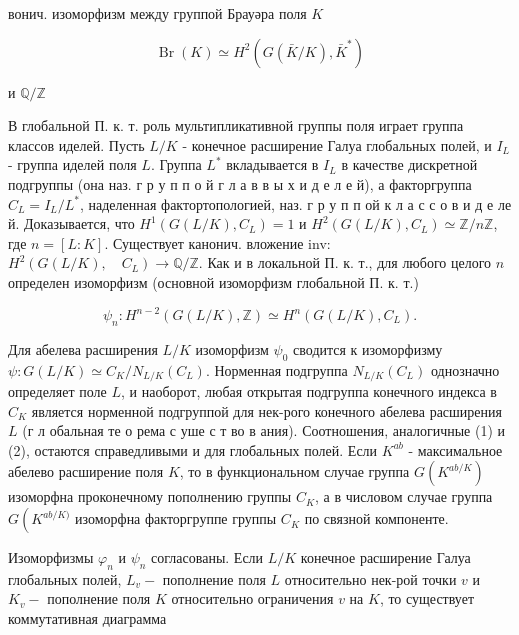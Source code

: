\documentclass[10pt]{article}
\begin{document}
вонич. изоморфизм между группой Брауәра поля $K$



\[

\operatorname{Br}(K) \simeq H^{2}\left(G(\bar{K} / K), \bar{K}^{*}\right)

\]



и $\mathbb{Q} / \mathbb{Z}$



В глобальной П. к. т. роль мультипликативной группы поля играет группа классов иделей. Пусть $L / K$ - конечное расширение Галуа глобальных полей, и $I_{L}$ - группа иделей поля $L$. Группа $L^{*}$ вкладывается в $I_{L}$ в качестве дискретной подгруппы (она наз. г р у п п о й $г$ л а в в ы х и д е л е й), а факторгруппа $C_{L}=I_{L} / L^{*}$, наделенная фактортопологией, наз. г р у п п ой к л а с с о в и д е ле й. Доказывается, что $H^{1}\left(G(L / K), C_{L}\right)=1$ и $H^{2}\left(G(L / K), C_{L}\right) \simeq \mathbb{Z} / n \mathbb{Z}$, где $n=[L: K]$. Существует канонич. вложение inv: $H^{2}\left(G(L / K), \quad C_{L}\right) \rightarrow \mathbb{Q} / \mathbb{Z}$. Как и в локальной П. к. т., для любого целого $n$ определен изоморфизм (основной изоморфизм глобальной П. к. т.)



\[

\psi_{n}: H^{n-2}(G(L / K), \mathbb{Z}) \simeq H^{n}\left(G(L / K), C_{L}\right) .

\]



Для абелева расширения $L / K$ изоморфизм $\psi_{0}$ сводится к изоморфизму $\psi: G(L / K) \simeq C_{K} / N_{L / K}\left(C_{L}\right)$. Норменная подгруппа $N_{L / K}\left(C_{L}\right)$ однозначно определяет поле $L$, и наоборот, любая открытая подгруппа конечного индекса в $C_{K}$ является норменной подгруппой для нек-рого конечного абелева расширения $L$ (г л обальная те о рема с уше с т во в ания). Соотношения, аналогичные (1) и (2), остаются справедливыми и для глобальных полей. Если $K^{a b}$ - максимальное абелево расширение поля $K$, то в функциональном случае группа $G\left(K^{a b / K}\right)$ изоморфна проконечному пополнению группы $C_{K}$, а в числовом случае группа $G\left(K^{a b / K)}\right.$ изоморфна факторгруппе группы $C_{K}$ по связной компоненте.



Изоморфизмы $\varphi_{n}$ и $\psi_{n}$ согласованы. Если $L / K$ конечное расширение Галуа глобальных полей, $L_{v}-$ пополнение поля $L$ относительно нек-рой точки $v$ и $K_{v}-$ пополнение поля $K$ относительно ограничения $v$ на $K$, то существует коммутативная диаграмма
\end{document}
